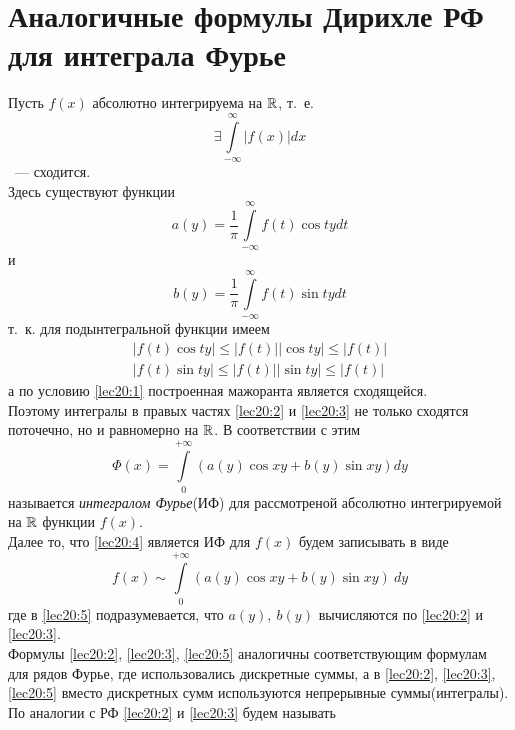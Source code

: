 \documentclass[../../main.tex]{subfiles}
\begin{document}
\section{Аналогичные формулы Дирихле РФ для интеграла Фурье}

Пусть $ f(x) $ абсолютно интегрируема на $ \mathbb{R} $, т.~е.
\begin{equation}
\label{lec20:1}
\exists \int\limits_{-\infty}^\infty |f(x)| dx
\end{equation}
~--- сходится.\\
Здесь существуют функции
\begin{equation}
\label{lec20:2}
a(y) = \dfrac{1}{\pi} \int\limits_{-\infty}^\infty 
f(t) \cos ty dt
\end{equation}
и
\begin{equation}
\label{lec20:3}
b(y) = \dfrac{1}{\pi} \int\limits_{-\infty}^\infty
f(t) \sin ty dt
\end{equation}
т.~к. для подынтегральной функции имеем
\[
\begin{gathered}
|f(t) \cos ty| \leq |f(t)||\cos ty| \leq |f(t)|\\
|f(t) \sin ty| \leq |f(t)||\sin ty| \leq |f(t)|
\end{gathered}
\]
а по условию \eqref{lec20:1} построенная мажоранта является сходящейся.\\
Поэтому интегралы в правых частях \eqref{lec20:2} и \eqref{lec20:3}
не только сходятся поточечно, но и равномерно на $ \mathbb{R} $.
В соответствии с этим 
\begin{equation}
\label{lec20:4}
\Phi(x) = \int\limits_0^{+\infty} \left(
a(y) \cos xy + b(y) \sin xy
\right) dy
\end{equation}
называется \emph{интегралом Фурье}(ИФ) для рассмотреной
абсолютно интегрируемой на $ \mathbb{R} $ функции $ f(x) $.\\
Далее то, что \eqref{lec20:4} является ИФ для $ f(x) $ будем записывать в виде
\begin{equation}
\label{lec20:5}
f(x) \sim \int\limits_0^{+\infty} \left(
a(y) \cos xy + b(y) \sin xy
\right) \ dy
\end{equation}
где в \eqref{lec20:5} подразумевается, что $ a(y),\ b(y) $ вычисляются по 
\eqref{lec20:2} и \eqref{lec20:3}.\\
Формулы \eqref{lec20:2}, \eqref{lec20:3}, \eqref{lec20:5} аналогичны
соответствующим формулам для рядов Фурье, где 
использовались дискретные суммы, а в 
\eqref{lec20:2}, \eqref{lec20:3}, \eqref{lec20:5}
вместо дискретных сумм используются непрерывные суммы(интегралы).
По аналогии с РФ \eqref{lec20:2} и \eqref{lec20:3} будем называть 
\end{document}
